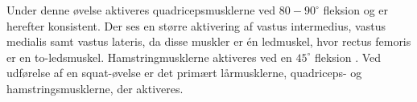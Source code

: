 Under denne øvelse aktiveres quadricepsmusklerne ved $80-90^{\circ}$ fleksion og er herefter konsistent. Der ses en større aktivering af vastus intermedius, vastus medialis samt vastus lateris, da disse muskler er én ledmuskel, hvor rectus femoris er en to-ledsmuskel. Hamstringmusklerne aktiveres ved en $45^{\circ}$ fleksion \citep{schoenfeld2010}. 
Ved udførelse af en squat-øvelse er det primært lårmusklerne, quadriceps- og hamstringsmusklerne, der aktiveres. 


